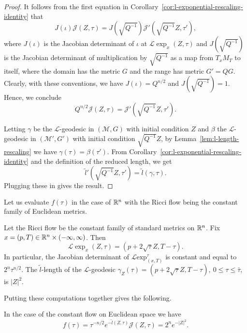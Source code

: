 \begin{proof}
\sketch
It follows from the first equation in Corollary~\ref{cor:l-exponential-rescaling-identity} that
$$J(\iota){\mathcal J}(Z,\tau)=J(\sqrt{Q^{-1}}){\mathcal
J}'(\sqrt{Q^{-1}}Z,\tau'),$$ where $J(\iota)$ is the Jacobian
determinant of $\iota$ at ${\mathcal L}\exp_x(Z,\tau)$ and
$J(\sqrt{Q^{-1}})$ is the Jacobian determinant of multiplication by
$\sqrt{Q^{-1}}$ as a map from $T_xM_T$ to itself, where the domain
has the metric $G$ and the range has metric $G'=QG$. Clearly, with
these conventions, we have $J(\iota)=Q^{n/2}$ and
$J(\sqrt{Q^{-1}})=1$. Hence, we conclude
$$Q^{n/2}{\mathcal J}(Z,\tau)={\mathcal J}'(\sqrt{Q^{-1}}Z,\tau').$$

Letting $\gamma$ be the ${\mathcal L}$-geodesic in $({\mathcal
M},G)$ with initial condition $Z$ and $\beta$ the ${\mathcal
L}$-geodesic in $({\mathcal M}',G')$ with initial condition
$\sqrt{Q^{-1}}Z$,  by Lemma~\ref{lem:l-length-rescaling} we have
$\gamma(\tau)=\beta(\tau')$. From Corollary~\ref{cor:l-exponential-rescaling-identity} and the
definition of the reduced length, we get $$\tilde
l'(\sqrt{Q^{-1}}Z,\tau')=\tilde l(\gamma,\tau).$$ Plugging these in
gives the result.
\end{proof}

Let us evaluate $f(\tau)$ in the case of $\mathbb{R}^n$ with the Ricci flow being the
constant family of Euclidean metrics.

\begin{example}\label{ex:l-exponential-euclidean}

Let the Ricci flow be the constant family of standard metrics on
$\mathbb{R}^n$. Fix $x=(p,T)\in \mathbb{R} ^n\times (-\infty,\infty)$. Then
$${\mathcal L}\exp_x(Z,\tau)=(p+2\sqrt{\tau}Z,T-\tau).$$
In particular, the Jacobian determinant of ${\mathcal L}\mathrm{exp}_{(x,T)}^\tau$ is constant and equal to $2^n\tau^{n/2}$. The
$\widetilde l$-length of the ${\mathcal L}$-geodesic
$\gamma_Z(\tau)=(p+2\sqrt{\tau}Z, T-\tau),\ 0\le \tau\le \bar\tau$,
is $|Z|^2$.
\end{example}

Putting these computations together gives the following.

\begin{claim}\label{claim:reduced-volume-integrand-euclidean}
\label{Arnquantity}

In the case of the constant flow on Euclidean space we have
$$f(\tau)=\tau^{-n/2}e^{-\tilde l(Z,\tau)}{\mathcal J}(Z,\tau)=2^ne^{-|Z|^2}.$$
\end{claim}

